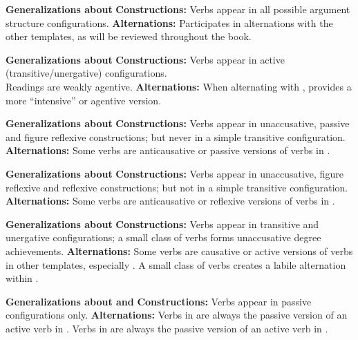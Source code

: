 \pex \textbf{Generalizations about {\tkal}}
	\a \textbf{Constructions:} Verbs appear in all possible argument structure configurations.
	\a \textbf{Alternations:} Participates in alternations with the other templates, as will be reviewed throughout the book.
\xe

\pex \textbf{Generalizations about {\tpie}}
	\a \textbf{Constructions:} Verbs appear in active (transitive/unergative) configurations.\\
		Readings are weakly agentive.
	\a \textbf{Alternations:} When alternating with {\tkal}, provides a more ``intensive'' or agentive version.
\xe

\pex \textbf{Generalizations about {\tnif}}
	\a \textbf{Constructions:} Verbs appear in unaccusative, passive and figure reflexive constructions; but never in a simple transitive configuration.
	\a \textbf{Alternations:} Some verbs are anticausative or passive versions of verbs in {\tkal}.
\xe

\pex \textbf{Generalizations about {\thit}}
	\a \textbf{Constructions:} Verbs appear in unaccusative, figure reflexive and reflexive constructions; but not in a simple transitive configuration.
	\a \textbf{Alternations:} Some verbs are anticausative or reflexive versions of verbs in {\tpie}.
\xe

\pex \textbf{Generalizations about {\thif}}
	\a \textbf{Constructions:} Verbs appear in transitive and unergative configurations; a small class of verbs forms unaccusative degree achievements.
	\a \textbf{Alternations:} Some verbs are causative or active versions of verbs in other templates, especially {\tkal}. A small class of verbs creates a labile alternation within {\thif}.
\xe

\pex \textbf{Generalizations about {\tpua} and {\thuf}}
	\a \textbf{Constructions:} Verbs appear in passive configurations only.
	\a \textbf{Alternations:} Verbs in {\tpua} are always the passive version of an active verb in {\tpie}. Verbs in {\thuf} are always the passive version of an active verb in {\thif}.
\xe

